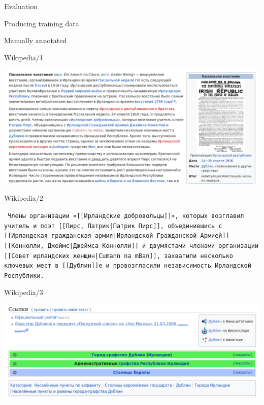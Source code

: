 \documentclass[10pt, compress]{beamer}
\begin{document}
\begin{frame}{Evaluation}


\end{frame}

\begin{frame}{Producing training data}


\end{frame}

\begin{frame}{Manually annotated}


\end{frame}

\begin{frame}{Wikipedia/1}

\includegraphics[width=\textwidth]{graphics/wikipedia-1.png}

\end{frame}

\begin{frame}{Wikipedia/2}

{\tt
Члены организации «[[Ирландские добровольцы]]», которых возглавил учитель 
и поэт [[Пирс, Патрик|Патрик Пирс]], объединившись с [[Ирландская гражданская армия|Ирландской Гражданской Армией]] [[Коннолли, Джеймс|Джеймса Коннолли]] и двумястами членами организации [[Совет ирландских женщин|Cumann na mBan]], захватили несколько ключевых мест в [[Дублин]]е и провозгласили независимость Ирландской Республики. 
}
\end{frame}

\begin{frame}{Wikipedia/3}

\includegraphics[width=\textwidth]{graphics/wikipedia-2.png}

\end{frame}
\end{document}
